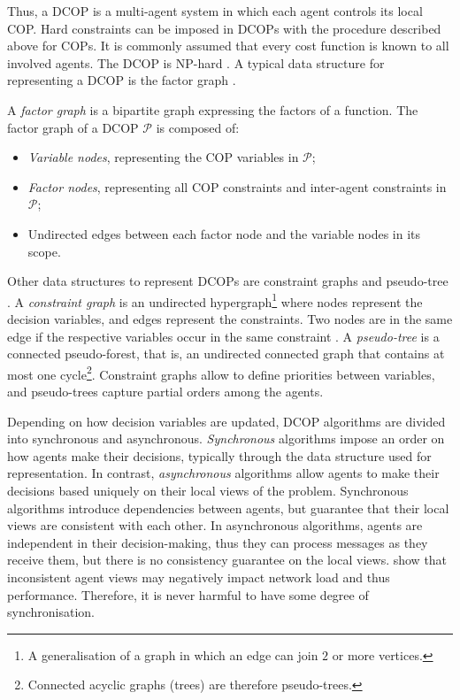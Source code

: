 Thus, a DCOP is a multi-agent system in which each agent controls its local COP. Hard
constraints can be imposed in DCOPs with the procedure described above for COPs. It is
commonly assumed that every cost function is known to all involved agents.
The DCOP is NP-hard \cite{farinelli2013dcop}.
A typical data structure for representing a DCOP is the factor graph
\cite{kschischang2001,loeliger2004}.
\begin{definition}\label{def:fg}
    A \emph{factor graph} is a bipartite graph expressing the factors of a function. The
    factor graph of a DCOP $\mathcal{P}$ is composed of:
    \begin{itemize}
        \item \emph{Variable nodes}, representing the COP variables in $\mathcal{P}$;
        \item \emph{Factor nodes}, representing all COP constraints and inter-agent
            constraints in $\mathcal{P}$;
        \item Undirected edges between each factor node and the variable nodes in its
            scope.
    \end{itemize}
\end{definition}
Other data structures to represent DCOPs are constraint graphs and pseudo-tree
\cite{fioretto2018survey}. A \emph{constraint graph} is an undirected
hypergraph\footnote{A generalisation of a graph in which an edge can join $2$ or more
vertices.} where nodes represent the decision variables, and edges represent the
constraints. Two nodes are in the same edge if the respective variables occur in the same
constraint \cite{rossi2006handbook}. A \emph{pseudo-tree} is a connected pseudo-forest,
that is, an undirected connected graph that contains at most one cycle\footnote{Connected
acyclic graphs (trees) are therefore pseudo-trees.}.
Constraint graphs allow to define priorities between variables, and pseudo-trees capture
partial orders among the agents.

Depending on how decision variables are updated, DCOP algorithms are divided into
synchronous and asynchronous. \emph{Synchronous} algorithms impose an order on how agents
make their decisions, typically through the data structure used for representation. In
contrast, \emph{asynchronous} algorithms allow agents to make their decisions based
uniquely on their local views of the problem. Synchronous algorithms introduce
dependencies between agents, but guarantee that their local views are consistent with each
other. In asynchronous algorithms, agents are independent in their decision-making, thus
they can process messages as they receive them, but there is no consistency guarantee on
the local views. \cite{peri2013} show that inconsistent agent views may negatively impact
network load and thus performance. Therefore, it is never harmful to have some degree of
synchronisation.

